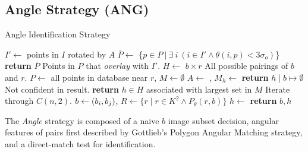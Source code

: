 \subsection{Angle Strategy (ANG)}\label{subsec:angleMethod}
\newcommand{\invalidBijection}{\If{$\forall \ \vv{b^\star}, \ \vv{b^\star} \in b \land h\left(\vv{b^\star}\right)
\neq \emptyset$}}
\begin{algorithm}
    \caption{Angle Identification Strategy} \label{algorithm:angleIdentification}
    \begin{algorithmic}[1]
        \State $I' \gets$ points in $I$ rotated by $A$
        \State $\bar{P} \gets $ \{$p \in P \ | \ \exists \ i \ (i \in I' \land \theta (i, p) < 3\sigma_o)$\}
        \State \textbf{return} $\bar{P}$ \Comment Points in $P$ that \textit{overlay} with $I'$.
        \EndFunction
        \State $H \gets $ $b \times r$ \Comment All possible pairings of $b$ and $r$.
        \State $P \gets $ all points in database near $r$, $M \gets \emptyset$
        \State $A \gets $ , $M_h \gets $ 
        \EndFor
        \State \textbf{return} $h \mid b \mapsto \emptyset $ \Comment Not confident in result.
        \Else
        \State \textbf{return} $h \in H$ associated with largest set in $M$
        \EndIf
        \EndFunction
         \Comment Iterate through $C(n, 2)$. \label{algline:angleI}
         \label{algline:angleJ}
        \State $b \gets \left(b_i, b_j\right)$, $R \gets \{ r \mid r \in K^2 \land P_\theta(r, b) \}$
        \State $h \gets $  %
        \invalidBijection
        \State \textbf{return} $b, h$
        \EndIf
        \EndIf
        \EndFor
        \EndFor
        \EndFunction
    \end{algorithmic}
\end{algorithm}

The \textit{Angle} strategy is composed of a naive $b$ image subset decision, angular features of pairs first described
by Gottlieb's Polygon Angular Matching strategy, and a direct-match test for identification.

